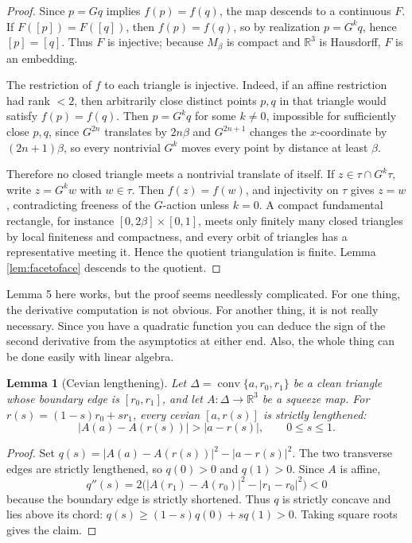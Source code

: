 \documentclass[12pt]{article}
\newcommand{\R}{\mathbb R}
\theoremstyle{plain}
\newtheorem{lemma}[theorem]{Lemma}
\newcommand{\review}[1]{\begin{reviewbox}#1\end{reviewbox}}
\begin{document}
\begin{proof}
Since \(p=Gq\) implies \(f(p)=f(q)\), the map descends to a continuous
\(F\).  If \(F([p])=F([q])\), then \(f(p)=f(q)\), so by realization
\(p=G^kq\), hence \([p]=[q]\).  Thus \(F\) is injective; because \(M_\beta\)
is compact and \(\R^3\) is Hausdorff, \(F\) is an embedding.

The restriction of \(f\) to each triangle is injective.  Indeed, if an affine
restriction had rank \(<2\), then arbitrarily close distinct points
\(p,q\) in that triangle would satisfy \(f(p)=f(q)\).  Then \(p=G^kq\) for
some \(k\ne0\), impossible for sufficiently close \(p,q\), since
\(G^{2n}\) translates by \(2n\beta\) and \(G^{2n+1}\) changes the
\(x\)-coordinate by \((2n+1)\beta\), so every nontrivial \(G^k\) moves every
point by distance at least \(\beta\).

Therefore no closed triangle meets a nontrivial translate of itself.  If
\(z\in\tau\cap G^k\tau\), write \(z=G^kw\) with \(w\in\tau\).  Then
\(f(z)=f(w)\), and injectivity on \(\tau\) gives \(z=w\), contradicting
freeness of the \(G\)-action unless \(k=0\).  A compact fundamental rectangle,
for instance \([0,2\beta]\times[0,1]\), meets only finitely many closed
triangles by local finiteness and compactness, and every orbit of triangles has
a representative meeting it.  Hence the quotient triangulation is finite.
Lemma \ref{lem:facetoface} descends to the quotient.
\end{proof}


\review{Lemma 5 here works, but the proof seems needlessly complicated. For one thing, the derivative computation is not obvious.  For another thing, it is not really necessary. Since you have a quadratic function you can deduce the sign of the second derivative from the asymptotics at either end.  Also, the whole thing can be done easily with linear algebra.}

\begin{lemma}[Cevian lengthening]\label{lem:cevian}
Let \(\Delta=\operatorname{conv}\{a,r_0,r_1\}\) be a clean triangle whose
boundary edge is \([r_0,r_1]\), and let \(A:\Delta\to\R^3\) be a squeeze map.
For \(r(s)=(1-s)r_0+sr_1\), every cevian \([a,r(s)]\) is strictly lengthened:
\[
|A(a)-A(r(s))|>|a-r(s)|,\qquad 0\le s\le1.
\]
\end{lemma}

\begin{proof}
Set \(q(s)=|A(a)-A(r(s))|^2-|a-r(s)|^2\).  The two transverse edges are
strictly lengthened, so \(q(0)>0\) and \(q(1)>0\).  Since \(A\) is affine,
\[
q''(s)=2\bigl(|A(r_1)-A(r_0)|^2-|r_1-r_0|^2\bigr)<0
\]
because the boundary edge is strictly shortened.  Thus \(q\) is strictly
concave and lies above its chord:
\(q(s)\ge(1-s)q(0)+sq(1)>0\).  Taking square roots gives the claim.
\end{proof}
\end{document}

